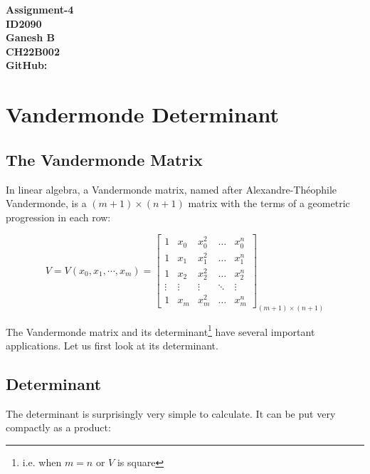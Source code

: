 \documentclass{article}
\begin{document}
\begin{titlepage}
    \centering
    \vfil
    {\bfseries\Large
        \huge{Assignment-4}\\
        \vskip1cm
        ID2090\\
        \vskip2cm
        Ganesh B\\
        \vskip0.3cm
        CH22B002\\
        \vskip0.3cm
        GitHub: {}\\
    }    
    \vfil
\end{titlepage}
\newpage

\section{Vandermonde Determinant}

\subsection{The Vandermonde Matrix}

In linear algebra, a Vandermonde matrix, named after Alexandre-Théophile Vandermonde, is a ${(m+1)\times (n+1)}$ matrix with the terms of a geometric progression in each row: 

$$
V=V\left(x_0, x_1, \cdots, x_m\right)=\left[\begin{array}{ccccc}
1 & x_0 & x_0^2 & \ldots & x_0^n \\
1 & x_1 & x_1^2 & \ldots & x_1^n \\
1 & x_2 & x_2^2 & \ldots & x_2^n \\
\vdots & \vdots & \vdots & \ddots & \vdots \\
1 & x_m & x_m^2 & \ldots & x_m^n
\end{array}\right]_{(m+1)\times(n+1)}
$$

The Vandermonde matrix and its determinant\footnote[4]{i.e. when $m=n$ or $V$ is square} have several important applications. Let us first look at its determinant.

\subsection{Determinant}

The determinant is surprisingly very simple to calculate. It can be put very compactly as a product:
\end{document}
